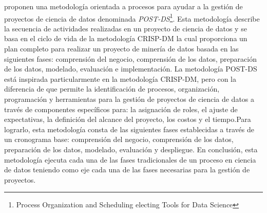 \citep{Costa2020} proponen una metodología orientada a procesos para ayudar a la gestión de proyectos de ciencia de datos denominada \textit{POST-DS}\footnote{Process Organization and Scheduling electing Tools for Data Science}. Esta metodología describe la secuencia de actividades realizadas en un proyecto de ciencia de datos y se basa en el ciclo de vida de la metodología CRISP-DM la cual proporciona un plan completo para realizar un proyecto de minería de datos basada en las siguientes fases: comprensión del negocio, comprensión de los datos, preparación de los datos, modelado, evaluación e implementación. La metodología POST-DS está inspirada particularmente en la metodología CRISP-DM, pero con la diferencia de que permite la identificación de procesos, organización, programación y herramientas para la gestión de proyectos de ciencia de datos a través de componentes específicos para: la asignación de roles, el ajuste de expectativas, la definición del alcance del proyecto, los costos y el tiempo.Para lograrlo, esta metodología consta de las siguientes fases establecidas a través de un cronograma base: comprensión del negocio, comprensión de los datos, preparación de los datos, modelado, evaluación y despliegue. En conclusión, esta metodología ejecuta cada una de las fases tradicionales de un proceso en ciencia de datos teniendo como eje cada una de las fases necesarias para la gestión de proyectos.

